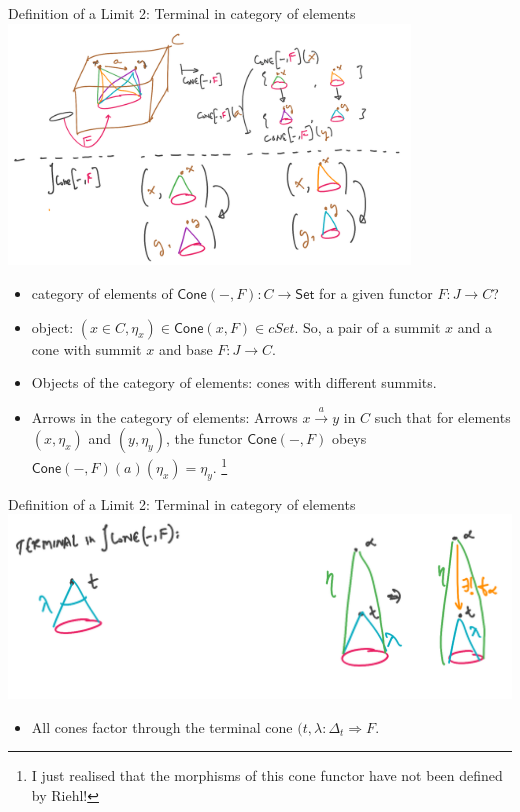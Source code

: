 \documentclass[8pt]{beamer}
\newcommand{\nt}{\Rightarrow}
\newcommand{\cat}[1]{\mathsf{#1}}
\newcommand{\cSet}{\cat{Set}}
\newcommand{\cCone}{\cat{Cone}}
\begin{document}
\begin{frame}{Definition of a Limit 2: Terminal in category of elements}
    \includegraphics[width=0.8\textwidth]{./category-of-elements-description.png}
    {\footnotesize
    \begin{itemize}
        \item category of elements of $\cCone(-, F): C \to \cSet$ for a given functor $F: J \to C$?
        \item object: $(x \in C, \eta_x) \in \cCone(x, F) \in cSet$. So, a pair of a summit $x$
            and a cone with summit $x$ and base $F: J \to C$.
        \item Objects of the category of elements: cones with different summits.
        \item Arrows in the category of elements: Arrows $ x \xrightarrow{a} y$
            in $C$ such that for elements $(x, \eta_x)$ and $(y, \eta_y)$, the
            functor $\cCone(-, F)$ obeys $\cCone(-, F)(a)(\eta_x) = \eta_y$.
            \footnote{I just realised that the morphisms of this cone functor
            have not been defined by Riehl!}
    \end{itemize} }
\end{frame}

\begin{frame}{Definition of a Limit 2: Terminal in category of elements}
    \includegraphics[width=\textwidth]{./category-of-elements-terminal.png}
    \begin{itemize}
        \item All cones factor through the terminal cone $(t, \lambda: \Delta_t \nt F$.
    \end{itemize}
\end{frame}
\end{document}
